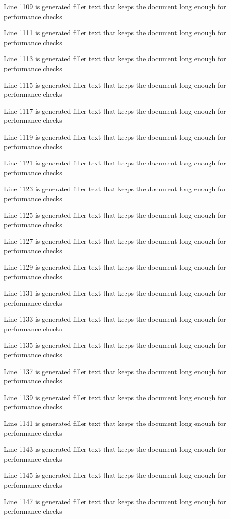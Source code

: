 Line 1109 is generated filler text that keeps the document long enough for performance checks.

Line 1111 is generated filler text that keeps the document long enough for performance checks.

Line 1113 is generated filler text that keeps the document long enough for performance checks.

Line 1115 is generated filler text that keeps the document long enough for performance checks.

Line 1117 is generated filler text that keeps the document long enough for performance checks.

Line 1119 is generated filler text that keeps the document long enough for performance checks.

Line 1121 is generated filler text that keeps the document long enough for performance checks.

Line 1123 is generated filler text that keeps the document long enough for performance checks.

Line 1125 is generated filler text that keeps the document long enough for performance checks.

Line 1127 is generated filler text that keeps the document long enough for performance checks.

Line 1129 is generated filler text that keeps the document long enough for performance checks.

Line 1131 is generated filler text that keeps the document long enough for performance checks.

Line 1133 is generated filler text that keeps the document long enough for performance checks.

Line 1135 is generated filler text that keeps the document long enough for performance checks.

Line 1137 is generated filler text that keeps the document long enough for performance checks.

Line 1139 is generated filler text that keeps the document long enough for performance checks.

Line 1141 is generated filler text that keeps the document long enough for performance checks.

Line 1143 is generated filler text that keeps the document long enough for performance checks.

Line 1145 is generated filler text that keeps the document long enough for performance checks.

Line 1147 is generated filler text that keeps the document long enough for performance checks.

